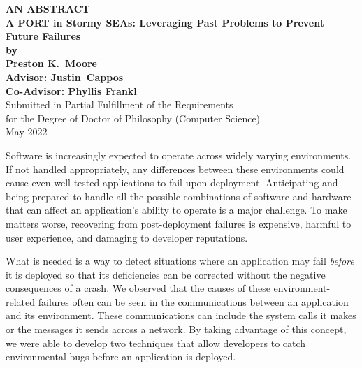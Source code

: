 \begin{center}

{\large\bf
   AN ABSTRACT\\[3ex]
   A PORT in Stormy SEAs: Leveraging Past Problems to Prevent Future Failures\\[2ex]
   by\\[3ex]
   Preston K.\ Moore\\[3ex]
   Advisor: Justin\ Cappos\\[2ex]
   Co-Advisor: Phyllis Frankl
}\\[3ex]
Submitted in Partial Fulfillment of the Requirements\\[2ex]
for the Degree of Doctor of Philosophy (Computer Science)\\[3ex]
May 2022
\end{center}

\vspace*{2.5ex}


Software is increasingly expected to operate across widely varying environments.
If not handled appropriately, any
differences between these environments
could cause even well-tested applications to fail upon deployment.
Anticipating and being prepared to handle all the possible combinations of
software and hardware that can affect an application’s ability to operate
is a major challenge.
To make matters worse,
recovering from post-deployment failures is expensive,
harmful to user experience,
and damaging to developer reputations.

What is needed is a way to detect situations where an application may fail
\textit{before} it is deployed so that its deficiencies can be corrected without the negative consequences of a crash.
We observed that
the causes of these environment-related failures
often can be seen in the
communications between an application and its environment.
These communications can include the
system calls it makes or the messages it sends across a network.
By taking advantage of this concept,
we were able to develop two techniques that allow developers to catch environmental bugs
before an application is deployed. 

